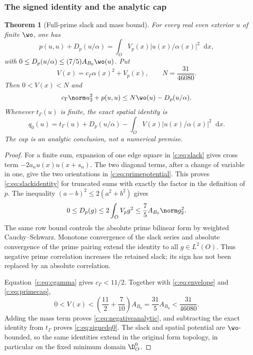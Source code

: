 \documentclass[11pt,a4paper]{article}
\numberwithin{equation}{section}
\newtheorem{theorem}{Theorem}[section]
\theoremstyle{definition}\newtheorem{definition}[theorem]{Definition}
\theoremstyle{remark}\newtheorem{remark}[theorem]{Remark}
\newcommand{\dd}{\mathop{}\!\mathrm d}\newcommand{\one}{\mathbf1}
\begin{document}
\subsubsection{The signed identity and the analytic cap}
\begin{theorem}[Full-prime slack and mass bound]\label{c:thm:signed}
For every real even exterior $u$ of finite $\wo$, one has
\begin{equation}\label{c:eq:slackidentity}
 p(u,u)+D_p(u/\alpha)
 =\int_O V_p(x)|u(x)/\alpha(x)|^2\dd x,
\end{equation}
with $0\le D_p(u/\alpha)\le(7/5)A_{B_0}\wo(u)$.
Put
\[
 V(x)=c_\Gamma\alpha(x)^2+V_p(x),\qquad N=\frac{31}{46080}.
\]
Then $0<V(x)<N$ and
\begin{equation}\label{c:eq:negativeanalytic}
 c_\Gamma\norm u_2^2+p(u,u)
 \le N \wo(u)-D_p(u/\alpha).
\end{equation}
Whenever $t_\Gamma(u)$ is finite, the exact spatial identity is
\begin{equation}\label{c:eq:signedq0}
 q_0(u)=t_\Gamma(u)+D_p(u/\alpha)
              -\int_OV(x)|u(x)/\alpha(x)|^2\dd x.
\end{equation}
The cap is an analytic conclusion, not a numerical premise.
\end{theorem}
\begin{proof}
For a finite sum, expansion of one edge square in \eqref{c:eq:slack}
gives cross term $-2a_nu(x)u(x+s_n)$. The two diagonal terms,
after a change of variable in one, give the two orientations in
\eqref{c:eq:primepotential}. This proves \eqref{c:eq:slackidentity} for
truncated sums with exactly the factor in the definition of $p$.
The inequality $(a-b)^2\le2(a^2+b^2)$ gives
\[
 0\le D_p(g)\le2\int_OV_pg^2\le\frac75 A_{B_0}\norm g_2^2.
\]
The same row bound controls the absolute prime bilinear form by
weighted Cauchy--Schwarz. Monotone convergence of the slack series and
absolute convergence of the prime pairing extend the identity to all
$g\in L^2(O)$. Thus negative prime correlation increases the retained
slack; its sign has not been replaced by an absolute correlation.

Equation~\eqref{c:eq:cgamma} gives $c_\Gamma<11/2$. Together with
\eqref{c:eq:envelope} and \eqref{c:eq:primecap},
\[
 0<V(x)<\left(\frac{11}{2}+\frac7{10}\right)A_{B_0}
 =\frac{31}{5}A_{B_0}<\frac{31}{46080}.
\]
Adding the mass term proves \eqref{c:eq:negativeanalytic}, and
subtracting the exact identity from $t_\Gamma$ proves
\eqref{c:eq:signedq0}. The slack and spatial potential are $\wo$-bounded,
so the same identities extend in the original form topology, in
particular on the fixed minimum domain $\D_O^0$.
\end{proof}
\end{document}

